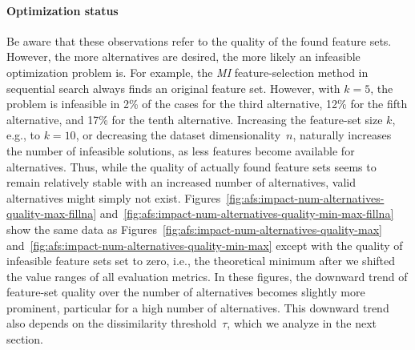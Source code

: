 \documentclass{article}
\theoremstyle{definition}
\begin{document}
\paragraph{Optimization status}

Be aware that these observations refer to the quality of the found feature sets.
However, the more alternatives are desired, the more likely an infeasible optimization problem is.
For example, the \emph{MI} feature-selection method in sequential search always finds an original feature set.
However, with $k=5$, the problem is infeasible in 2\% of the cases for the third alternative, 12\% for the fifth alternative, and 17\% for the tenth alternative.
Increasing the feature-set size $k$, e.g., to $k=10$, or decreasing the dataset dimensionality~$n$, naturally increases the number of infeasible solutions, as less features become available for alternatives.
Thus, while the quality of actually found feature sets seems to remain relatively stable with an increased number of alternatives, valid alternatives might simply not exist.
Figures~\ref{fig:afs:impact-num-alternatives-quality-max-fillna} and~\ref{fig:afs:impact-num-alternatives-quality-min-max-fillna} show the same data as Figures~\ref{fig:afs:impact-num-alternatives-quality-max} and~\ref{fig:afs:impact-num-alternatives-quality-min-max} except with the quality of infeasible feature sets set to zero, i.e., the theoretical minimum after we shifted the value ranges of all evaluation metrics.
In these figures, the downward trend of feature-set quality over the number of alternatives becomes slightly more prominent, particular for a high number of alternatives.
This downward trend also depends on the dissimilarity threshold~$\tau$, which we analyze in the next section.
\end{document}
